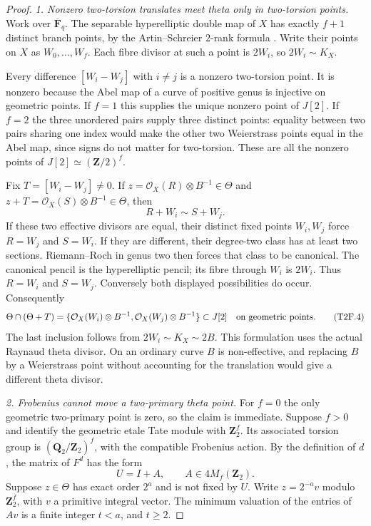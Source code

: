 \begin{proof}
\emph{1. Nonzero two-torsion translates meet theta only in
two-torsion points.}
Work over $\overline{\mathbf F}_q$. The separable hyperelliptic
double map of $X$ has exactly $f+1$ distinct branch points, by
the Artin--Schreier $2$-rank formula
\cite[Lemma~2.6]{PriesZhu2012}. Write their points on $X$ as
$W_0,\ldots,W_f$. Each fibre divisor at such a point is $2W_i$,
so $2W_i\sim K_X$.

Every difference $[W_i-W_j]$ with $i\ne j$ is a nonzero
two-torsion point. It is nonzero because the Abel map of a curve
of positive genus is injective on geometric points. If $f=1$
this supplies the unique nonzero point of $J[2]$. If $f=2$ the
three unordered pairs supply three distinct points: equality
between two pairs sharing one index would make the other two
Weierstrass points equal in the Abel map, since signs do not
matter for two-torsion. These are all the nonzero points of
$J[2]\simeq(\mathbf Z/2)^f$.

Fix $T=[W_i-W_j]\ne0$. If
$z=\mathcal O_X(R)\otimes B^{-1}\in\Theta$ and
$z+T=\mathcal O_X(S)\otimes B^{-1}\in\Theta$, then
\[
                        R+W_i\sim S+W_j.
 \tag{T2F.3}
\]
If these two effective divisors are equal, their distinct fixed
points $W_i,W_j$ force $R=W_j$ and $S=W_i$. If they are
different, their degree-two class has at least two sections.
Riemann--Roch in genus two then forces that class to be canonical.
The canonical pencil is the hyperelliptic pencil; its fibre
through $W_i$ is $2W_i$. Thus $R=W_i$ and $S=W_j$.
Conversely both displayed possibilities do occur. Consequently
\[
 \Theta\cap(\Theta+T)
   =\{\mathcal O_X(W_i)\otimes B^{-1},
       \mathcal O_X(W_j)\otimes B^{-1}\}
                  \subset J[2]
 \quad\hbox{on geometric points}.
 \tag{T2F.4}
\]
The last inclusion follows from $2W_i\sim K_X\sim2B$.
This formulation uses the actual Raynaud theta divisor. On an
ordinary curve $B$ is non-effective, and replacing $B$ by a
Weierstrass point without accounting for the translation would
give a different theta divisor.

\emph{2. Frobenius cannot move a two-primary theta point.}
For $f=0$ the only geometric two-primary point is zero, so the
claim is immediate. Suppose $f>0$ and identify the geometric
etale Tate module with $\mathbf Z_2^f$. Its associated torsion
group is $(\mathbf Q_2/\mathbf Z_2)^f$, with the compatible
Frobenius action. By the definition of $d$, the matrix of $F^d$
has the form
\[
                        U=I+A,\qquad A\in4M_f(\mathbf Z_2).
 \tag{T2F.5}
\]
Suppose $z\in\Theta$ has exact order $2^a$ and is not fixed by
$U$. Write $z=2^{-a}v$ modulo $\mathbf Z_2^f$, with $v$ a
primitive integral vector. The minimum valuation of the entries
of $Av$ is a finite integer $t<a$, and $t\ge2$.


\end{proof}
